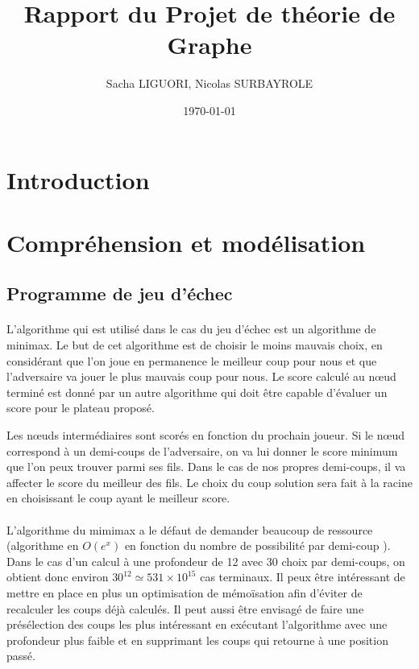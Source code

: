 \documentclass[11pt]{article}
\author{Sacha LIGUORI, Nicolas SURBAYROLE}
\title{Rapport du Projet de théorie de Graphe}
\date{\today}
\begin{document}
\maketitle

\tableofcontents

\newpage

\section{Introduction}


\section{Compréhension et modélisation}

\subsection{Programme de jeu d'échec}

\paragraph{}
L'algorithme qui est utilisé dans le cas du jeu d'échec est un algorithme de minimax. Le but de cet algorithme est de choisir le moins mauvais choix, en considérant que l'on joue en permanence le meilleur coup pour nous et que l'adversaire va jouer le plus mauvais coup pour nous. Le score calculé au n\oe ud terminé est donné par un autre algorithme qui doit être capable d'évaluer un score pour le plateau proposé.

Les n\oe uds intermédiaires sont scorés en fonction du prochain joueur. Si le n\oe ud correspond à un demi-coups de l'adversaire, on va lui donner le score minimum que l'on peux trouver parmi ses fils. Dans le cas de nos propres demi-coups, il va affecter le score du meilleur des fils. Le choix du coup solution sera fait à la racine en choisissant le coup ayant le meilleur score.

\paragraph{}

L'algorithme du mimimax a le défaut de demander beaucoup de ressource (algorithme en $O(e^{x})$ en fonction du nombre de possibilité par demi-coup ). Dans le cas d'un calcul à une profondeur de 12 avec 30 choix par demi-coups, on obtient donc environ $30^{12} \simeq 531 \times 10^{15}$ cas terminaux. Il peux être intéressant de mettre en place en plus un optimisation de mémoïsation afin d'éviter de recalculer les coups déjà calculés. Il peut aussi être envisagé de faire une présélection des coups les plus intéressant en exécutant l'algorithme avec une profondeur plus faible et en supprimant les coups qui retourne à une position passé.
\end{document}
